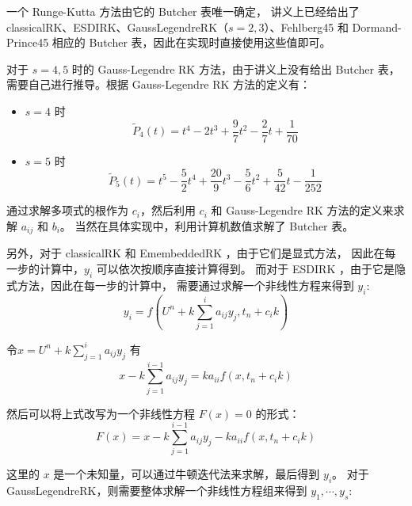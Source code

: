 \documentclass[a4paper]{article}
\begin{document}
\par  一个 Runge-Kutta 方法由它的 Butcher 表唯一确定，
讲义上已经给出了 classicalRK、ESDIRK、GaussLegendreRK（$s=2,3$）、Fehlberg45
和 Dormand-Prince45 
相应的 Butcher 表，因此在实现时直接使用这些值即可。
\par 对于 $s=4,5$ 时的 Gauss-Legendre RK 方法，由于讲义上没有给出 Butcher 表，
需要自己进行推导。根据 Gauss-Legendre RK 方法的定义有：
\begin{itemize}
    \item $s=4$ 时\\
    \begin{equation}
        \tilde{P}_4(t)
        = t^4 - 2t^3 + \frac{9}{7}t^2 - \frac{2}{7}t + \frac{1}{70}
    \end{equation}
    \item $s=5$ 时\\
    \begin{equation}
        \tilde{P}_5(t)
        = t^5 - \frac{5}{2}t^4 + \frac{20}{9}t^3 - \frac{5}{6}t^2 + \frac{5}{42}t - \frac{1}{252}
    \end{equation}
\end{itemize}
\par 通过求解多项式的根作为 $c_i$，然后利用 $c_i$ 和 Gauss-Legendre RK 方法的定义来求解 $a_{ij}$ 和 $b_i$。
当然在具体实现中，利用计算机数值求解了 Butcher 表。
\par 另外，对于 classicalRK 和 EmembeddedRK ，由于它们是显式方法，
因此在每一步的计算中，$y_{i}$ 可以依次按顺序直接计算得到。
而对于 ESDIRK ，由于它是隐式方法，因此在每一步的计算中，
需要通过求解一个非线性方程来得到 $y_{i}$:
\begin{equation}
    y_{i} = f\left(U^n + k \sum_{j=1}^{i} a_{ij} y_j,t_n + c_i k\right)
\end{equation}
\par 令$x = U^n + k \displaystyle\sum_{j=1}^{i} a_{ij} y_j$ 有
\begin{equation}
    x - k \sum_{j=1}^{i-1} a_{ij} y_j = ka_{ii}f\left(x,t_n + c_i k\right)
\end{equation}
\par 然后可以将上式改写为一个非线性方程 $F(x) = 0$ 的形式：
\begin{equation}
    F(x) = x - k \sum_{j=1}^{i-1} a_{ij} y_j - ka_{ii}f\left(x,t_n + c_i k\right)
\end{equation}
\par 这里的 $x$ 是一个未知量，可以通过牛顿迭代法来求解，最后得到 $y_i$。
对于 GaussLegendreRK，则需要整体求解一个非线性方程组来得到 $y_{1}, \cdots, y_s$:
\end{document}
